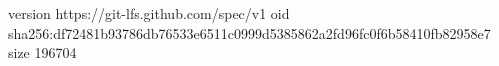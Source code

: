 version https://git-lfs.github.com/spec/v1
oid sha256:df72481b93786db76533e6511c0999d5385862a2fd96fc0f6b58410fb82958e7
size 196704

